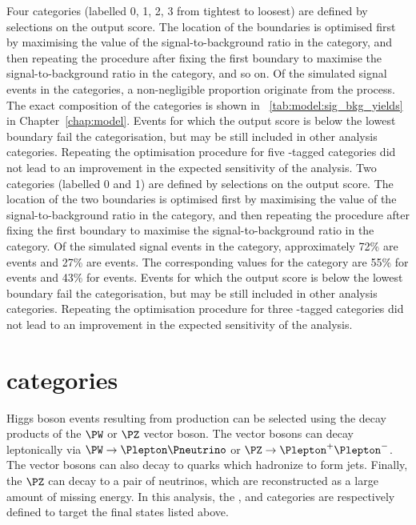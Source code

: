 \ifNewAnalysis
Four \VBFTag categories (labelled 0, 1, 2, 3 from tightest to loosest) are defined by selections on the \DiPhoDiJetBdt output score. 
The location of the boundaries is optimised first by maximising the value of the signal-to-background ratio in the  category, and then repeating the procedure after fixing the first boundary to maximise the signal-to-background ratio in the  category, and so on. Of the simulated signal events in the \VBFTag categories, a non-negligible proportion originate from the \ggH process. The exact composition of the categories is shown in \Table~\ref{tab:model:sig_bkg_yields} in Chapter~\ref{chap:model}. Events for which the \DiPhoDiJetBdt output score is below the lowest boundary fail the \VBFTag categorisation, but may be still included in other analysis categories. Repeating the optimisation procedure for five \VBF-tagged categories did not lead to an improvement in the expected sensitivity of the analysis.
\else
Two \VBFTag categories (labelled 0 and 1) are defined by selections on the \DiPhoDiJetBdt output score. 
The location of the two boundaries is optimised first by maximising the value of the signal-to-background ratio in the  category, and then repeating the procedure after fixing the first boundary to maximise the signal-to-background ratio in the  category. Of the simulated signal events in the  category, approximately 72\% are \VBF events and 27\% are \ggH events. The corresponding values for the  category are 55\% for \VBF events and 43\% for \ggH events. Events for which the \DiPhoDiJetBdt output score is below the lowest boundary fail the \VBFTag categorisation, but may be still included in other analysis categories. Repeating the optimisation procedure for three \VBF-tagged categories did not lead to an improvement in the expected sensitivity of the analysis.
\fi

\ifNewAnalysis
\section{\VHTag categories}
\label{cat:sec:vhtag}

Higgs boson events resulting from \VH production can be selected using the decay products of the $\PW$ or $\PZ$ vector boson. The vector bosons can decay leptonically via $\PW \rightarrow \Plepton \Pneutrino$ or $\PZ \rightarrow \Plepton^{+} \Plepton^{-}$. The vector bosons can also decay to quarks which hadronize to form jets. Finally, the $\PZ$ can decay to a pair of neutrinos, which are reconstructed as a large amount of missing energy. In this analysis, the \VHLeptonicTag, \VHHadronicTag and \VHMETTag categories are respectively defined to target the final states listed above. %

